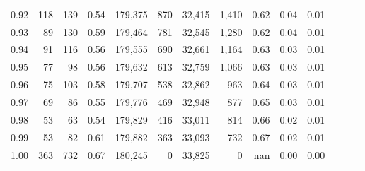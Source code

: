 \begin{tabular}{rrrrrrrrrrrrrr}
0.92 &    118 &  139 &  0.54 &  179,375 &      870 &  32,415 &   1,410 &  0.62 &  0.04 &      0.01 \\
0.93 &     89 &  130 &  0.59 &  179,464 &      781 &  32,545 &   1,280 &  0.62 &  0.04 &      0.01 \\
0.94 &     91 &  116 &  0.56 &  179,555 &      690 &  32,661 &   1,164 &  0.63 &  0.03 &      0.01 \\
0.95 &     77 &   98 &  0.56 &  179,632 &      613 &  32,759 &   1,066 &  0.63 &  0.03 &      0.01 \\
0.96 &     75 &  103 &  0.58 &  179,707 &      538 &  32,862 &     963 &  0.64 &  0.03 &      0.01 \\
0.97 &     69 &   86 &  0.55 &  179,776 &      469 &  32,948 &     877 &  0.65 &  0.03 &      0.01 \\
0.98 &     53 &   63 &  0.54 &  179,829 &      416 &  33,011 &     814 &  0.66 &  0.02 &      0.01 \\
0.99 &     53 &   82 &  0.61 &  179,882 &      363 &  33,093 &     732 &  0.67 &  0.02 &      0.01 \\
1.00 &    363 &  732 &  0.67 &  180,245 &        0 &  33,825 &       0 &   nan &  0.00 &      0.00 \\
\bottomrule
\end{tabular}
